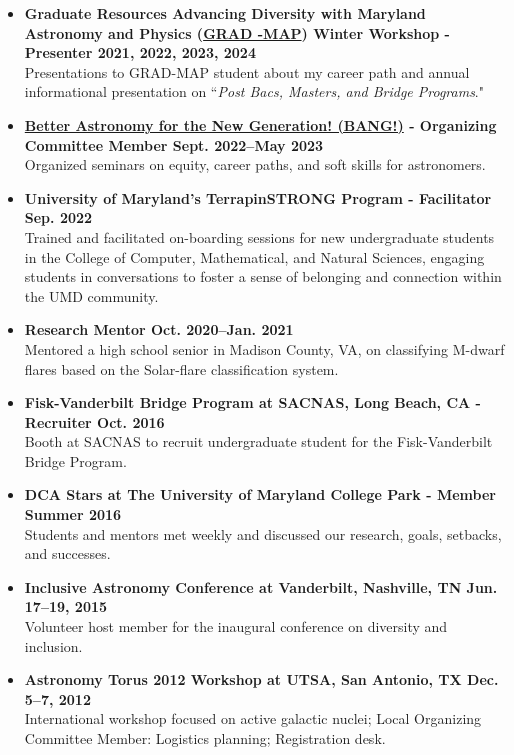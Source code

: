 \documentclass[12pt]{article}
\begin{document}
\begin{itemize}
    \item \textbf{Graduate Resources Advancing Diversity with Maryland Astronomy and Physics (\href{https://www.umdgradmap.org/}{GRAD -MAP}) Winter Workshop - Presenter \hfill 2021, 2022, 2023, 2024} \\
    Presentations to GRAD-MAP student about my career path and annual informational presentation on ``{\it Post Bacs, Masters, and Bridge Programs}."
    \item \textbf{\href{https://www.astro.umd.edu/events/colloquia/bang.html}{Better Astronomy for the New Generation! (BANG!)} - Organizing Committee Member \hfill Sept. 2022--May 2023} \\
    Organized seminars on equity, career paths, and soft skills for astronomers.
    \item \textbf{University of Maryland's TerrapinSTRONG Program - Facilitator \hfill Sep. 2022} \\
    Trained and facilitated on-boarding sessions for new undergraduate students in the College of Computer, Mathematical, and Natural Sciences, engaging students in conversations to foster a sense of belonging and connection within the UMD community.
    \item \textbf{Research Mentor \hfill Oct. 2020--Jan. 2021} \\
    Mentored a high school senior in Madison County, VA, on classifying M-dwarf flares based on the Solar-flare classification system.
    \item \textbf{Fisk-Vanderbilt Bridge Program at SACNAS, Long Beach, CA - Recruiter \hfill Oct. 2016} \\
    Booth at SACNAS to recruit undergraduate student for the Fisk-Vanderbilt Bridge Program.
    \item \textbf{DCA Stars at The University of Maryland College Park - Member \hfill Summer 2016} \\
    Students and mentors met weekly and discussed our research, goals, setbacks, and successes.
    \item \textbf{Inclusive Astronomy Conference at Vanderbilt, Nashville, TN \hfill Jun. 17--19, 2015} \\
    Volunteer host member for the inaugural conference on diversity and inclusion.
    \item \textbf{Astronomy Torus 2012 Workshop at UTSA, San Antonio, TX \hfill Dec. 5--7, 2012} \\
    International workshop focused on active galactic nuclei; Local Organizing Committee Member: Logistics planning; Registration desk.
\end{itemize}
\end{document}

